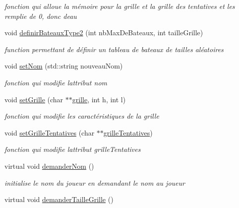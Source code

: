 \begin{DoxyCompactItemize}
\begin{DoxyCompactList}\small\item\em fonction qui alloue la mémoire pour la grille et la grille des tentatives et les remplie de 0, donc d\textquotesingle{}eau \end{DoxyCompactList}\item 
void \hyperlink{class_joueur_a1f4357df61efbc2ead45d24a190ebb83}{definir\+Bateaux\+Type2} (int nb\+Max\+De\+Bateaux, int taille\+Grille)
\begin{DoxyCompactList}\small\item\em function permettant de définir un tableau de bateaux de tailles aléatoires \end{DoxyCompactList}\item 
void \hyperlink{class_joueur_a7f016748c27a4ddad2d363f4b5121ab1}{set\+Nom} (std\+::string nouveau\+Nom)
\begin{DoxyCompactList}\small\item\em fonction qui modifie l\textquotesingle{}attribut nom \end{DoxyCompactList}\item 
void \hyperlink{class_joueur_a424aec3294ea6019f372fd2d67ae5001}{set\+Grille} (char $\ast$$\ast$\hyperlink{class_joueur_a97a052f0b9966c94c49862df3144a62f}{grille}, int h, int l)
\begin{DoxyCompactList}\small\item\em fonction qui modifie les caractéristiques de la grille \end{DoxyCompactList}\item 
void \hyperlink{class_joueur_a11942778d97fd6f5823d8ef1ab964047}{set\+Grille\+Tentatives} (char $\ast$$\ast$\hyperlink{class_joueur_abbef5ee9c9c05a24ffa2c462e14cdfd7}{grille\+Tentatives})
\begin{DoxyCompactList}\small\item\em fonction qui modifie l\textquotesingle{}attribut grille\+Tentatives \end{DoxyCompactList}\item 
virtual void \hyperlink{class_joueur_a9027bfc622d9a175340b5fffe915c7b2}{demander\+Nom} ()\hypertarget{class_joueur_a9027bfc622d9a175340b5fffe915c7b2}{}\label{class_joueur_a9027bfc622d9a175340b5fffe915c7b2}

\begin{DoxyCompactList}\small\item\em initialise le nom du joueur en demandant le nom au joueur \end{DoxyCompactList}\item 
virtual void \hyperlink{class_joueur_a58fe79e4845404f361d5bc0fe9474135}{demander\+Taille\+Grille} ()\hypertarget{class_joueur_a58fe79e4845404f361d5bc0fe9474135}{}\label{class_joueur_a58fe79e4845404f361d5bc0fe9474135}


\end{DoxyCompactItemize}
